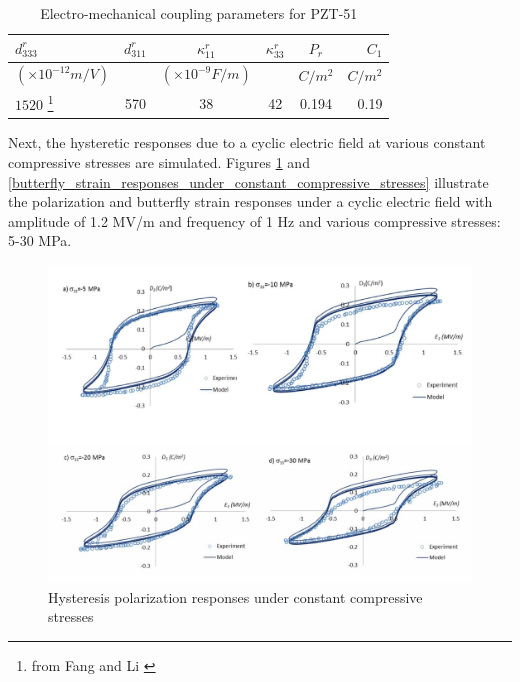 \begin{table}
\caption{Electro-mechanical coupling parameters for PZT-51}
\centering
\begin{tabular}{l c c c c r}
\hline 
$d^r_{333}$ & $d^r_{311}$& $\kappa^r_{11}$&$\kappa^r_{33}$ & $P_r$& $C_1$ \\  \hline
$(\times 10^{-12} m/V)$ & & $(\times 10^{-9} F/m)$ &  & $C/m^2$& $C/m^2$ \\ \hline
$1520$ \footnote{ from Fang and Li \cite{raey}} & 570 & 38 & 42 & 0.194 & 0.19 \\  \hline
\end{tabular}
\label{table:MatPZT_51_Electro_mechanical_coupling}
\end{table}

Next, the hysteretic responses due to a cyclic electric field at various constant compressive stresses are simulated. 
Figures \ref{hysteresis_polarization_responses_under_constant_compressive_stresses} and \ref{butterfly_strain_responses_under_constant_compressive_stresses} illustrate the polarization and butterfly strain responses under a cyclic electric field with amplitude of 1.2 MV/m and frequency of 1 Hz and various compressive stresses: 5-30 MPa. 
\begin{figure} 
\centering 
\includegraphics[width=6.0in]{./chap_2_pol_sw/figures/hysteresis_polarization_responses_under_constant_compressive_stresses.pdf} 
\caption{Hysteresis polarization responses under constant compressive stresses}
\label{hysteresis_polarization_responses_under_constant_compressive_stresses}
\end{figure}
